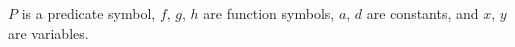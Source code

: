 $P$ is a predicate symbol, $f$, $g$, $h$ are function symbols, $a$, $d$ are constants, and $x$, $y$ are variables.
